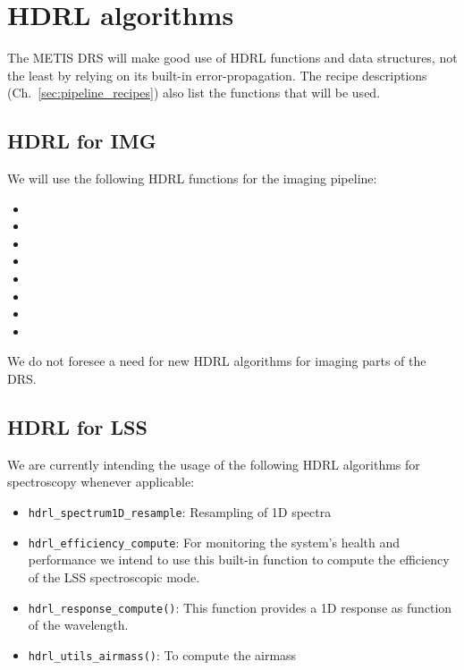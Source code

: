 \clearpage
\section{HDRL algorithms}\label{sec:hdrl_algorithms}

The METIS \ac{DRS} will make good use of \ac{HDRL} functions and data structures, not
the least by relying on its built-in error-propagation. The recipe descriptions
(Ch.~\ref{sec:pipeline_recipes}) also list the functions that will be used.

\subsection{HDRL for IMG}\label{ssec:hdrlimg}
We will use the following \ac{HDRL} functions for the imaging pipeline:
\begin{itemize}
    \item {}
    \item {}
    \item {}
    \item {}
    \item {}
    \item {}
    \item {}
    \item {}
\end{itemize}

We do not foresee a need for new \ac{HDRL} algorithms for imaging parts of the \ac{DRS}.



\subsection{HDRL for LSS}\label{ssec:hdrllss}
We are currently intending the usage of the following \ac{HDRL} algorithms for spectroscopy whenever applicable:
\begin{itemize}
    \item \texttt{hdrl\_spectrum1D\_resample}: Resampling of 1D spectra
    \item \texttt{hdrl\_efficiency\_compute}: For monitoring the system's health and performance we intend to use this built-in function to compute the efficiency of the \ac{LSS} spectroscopic mode.
    \item \texttt{hdrl\_response\_compute()}: This function provides a 1D response as function of the wavelength. 
    \item \texttt{hdrl\_utils\_airmass()}: To compute the airmass
\end{itemize}

